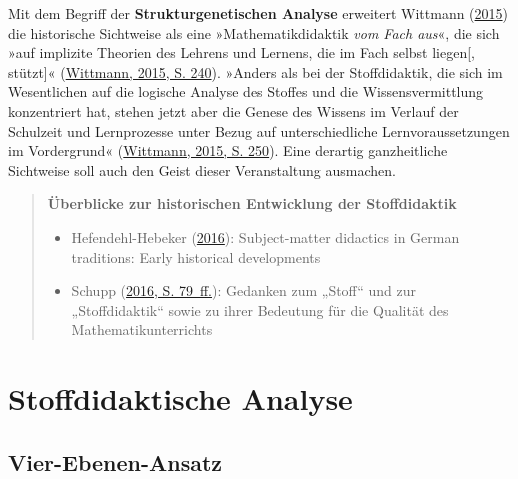 \documentclass[
]{scrbook}
\providecommand{\tightlist}{%
  \setlength{\itemsep}{0pt}\setlength{\parskip}{0pt}}
\theoremstyle{definition}
\theoremstyle{definition}
\theoremstyle{definition}
\theoremstyle{definition}
\theoremstyle{remark}
\begin{document}
Mit dem Begriff der \textbf{Strukturgenetischen Analyse} erweitert Wittmann (\protect\hyperlink{ref-Wittmann:2015}{2015}) die historische Sichtweise als eine »Mathematikdidaktik \emph{vom Fach aus}«, die sich »auf implizite Theorien des Lehrens und Lernens, die im Fach selbst liegen{[}, stützt{]}« (\protect\hyperlink{ref-Wittmann:2015}{Wittmann, 2015, S. 240}). »Anders als bei der Stoffdidaktik, die sich im Wesentlichen auf die logische Analyse des Stoffes und die Wissensvermittlung konzentriert hat, stehen jetzt aber die Genese des Wissens im Verlauf der Schulzeit und Lernprozesse unter Bezug auf unterschiedliche Lernvoraussetzungen im Vordergrund« (\protect\hyperlink{ref-Wittmann:2015}{Wittmann, 2015, S. 250}). Eine derartig ganzheitliche Sichtweise soll auch den Geist dieser Veranstaltung ausmachen.

\begin{quote}
\textbf{Überblicke zur historischen Entwicklung der Stoffdidaktik}

\begin{itemize}
\tightlist
\item
  Hefendehl-Hebeker (\protect\hyperlink{ref-Hefendehl-Hebeker:2016}{2016}): Subject-matter didactics in German traditions: Early historical developments
\item
  Schupp (\protect\hyperlink{ref-Schupp:2016}{2016, S. 79~ff.}): Gedanken zum „Stoff`` und zur „Stoffdidaktik`` sowie zu ihrer Bedeutung für die Qualität des Mathematikunterrichts
\end{itemize}
\end{quote}

\hypertarget{part-stoffdidaktische-analyse}{%
\part*{Stoffdidaktische Analyse}\label{part-stoffdidaktische-analyse}}

\hypertarget{vier-ebenen-ansatz}{%
\chapter{Vier-Ebenen-Ansatz}\label{vier-ebenen-ansatz}}
\end{document}
